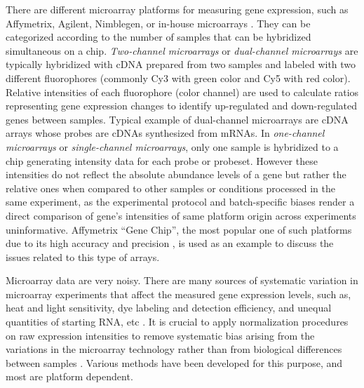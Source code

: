 There are different microarray platforms for measuring gene expression, such as
Affymetrix, Agilent, Nimblegen, or in-house microarrays \cite{Sasik2004}.
They can be categorized according to the number of samples that can be
hybridized simultaneous on a chip.
%
\textit{Two-channel microarrays} or \textit{dual-channel microarrays}
are typically hybridized with cDNA prepared from two samples and
labeled with two different fluorophores (commonly Cy3 with green
color and Cy5 with red color).
%
Relative intensities of each fluorophore (color channel) are used to calculate
ratios representing gene expression changes to identify up-regulated and
down-regulated genes between samples.
%
Typical example of dual-channel microarrays are cDNA arrays whose
probes are cDNAs synthesized from mRNAs.
%
In \textit{one-channel microarrays} or \textit{single-channel
  microarrays}, only one sample is hybridized to a chip generating
intensity data for each probe or probeset.
%
However these intensities do not reflect the absolute abundance levels of a
gene but rather the relative ones when compared to other samples or conditions
processed in the same experiment, as the experimental protocol and
batch-specific biases render a direct comparison of gene's intensities of same
platform origin across experiments uninformative.
%
Affymetrix ``Gene Chip'', the most popular one of such platforms due to its
high accuracy and precision \cite{Irizarry2005}, is used as an example to
discuss the issues related to this type of arrays.


Microarray data are very noisy.  There are many sources of systematic variation
in microarray experiments that affect the measured gene expression levels, such
as, heat and light sensitivity, dye labeling and detection efficiency, and
unequal quantities of starting RNA, etc \cite{Kerr2001,Zakharkin2005}.
%
It is crucial to apply normalization procedures on raw expression intensities
to remove systematic bias arising from the variations in the microarray
technology rather than from biological differences between samples 
\cite{Quackenbush2002}.
%
Various methods have been developed for this purpose, and most are platform
dependent.

